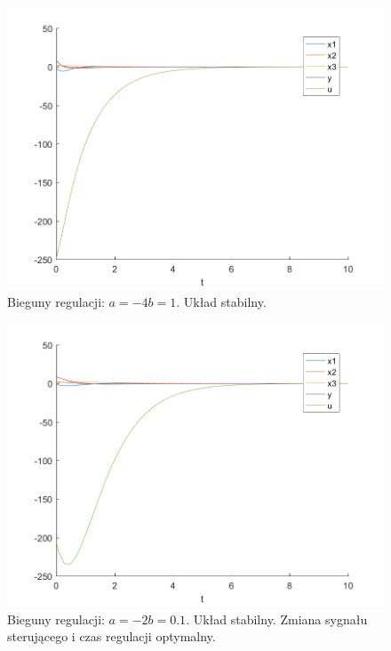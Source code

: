 \documentclass{article}
\begin{document}
\begin{figure}[H]
\centering
\includegraphics[width=0.9\linewidth]{z6_-4,1}
\caption{Bieguny regulacji: $a = -4 b = 1$. Układ stabilny.}
\label{fig:z6-41}
\end{figure}

\begin{figure}[H]
\centering
\includegraphics[width=0.9\linewidth]{z6_-2,01}
\caption{Bieguny regulacji: $a = -2 b = 0.1$. Układ stabilny. Zmiana sygnału sterującego i czas regulacji optymalny.}
\label{fig:z6-201}
\end{figure}
\end{document}
